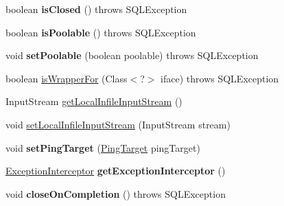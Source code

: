 \begin{DoxyCompactItemize}
boolean {\bfseries is\+Closed} ()  throws S\+Q\+L\+Exception 
\item 
\mbox{\label{classcom_1_1mysql_1_1cj_1_1jdbc_1_1_statement_impl_af6867cf70a7da2cf3141b4435116faeb}} 
boolean {\bfseries is\+Poolable} ()  throws S\+Q\+L\+Exception 
\item 
\mbox{\label{classcom_1_1mysql_1_1cj_1_1jdbc_1_1_statement_impl_ac5a27f06b5bc99195e039732366a33f5}} 
void {\bfseries set\+Poolable} (boolean poolable)  throws S\+Q\+L\+Exception 
\item 
boolean \mbox{\hyperlink{classcom_1_1mysql_1_1cj_1_1jdbc_1_1_statement_impl_a403bf25ba81ab01a60bdb9f2d4b4cfed}{is\+Wrapper\+For}} (Class$<$?$>$ iface)  throws S\+Q\+L\+Exception 
\item 
Input\+Stream \mbox{\hyperlink{classcom_1_1mysql_1_1cj_1_1jdbc_1_1_statement_impl_a52f35ba4029870388a69d493851e726a}{get\+Local\+Infile\+Input\+Stream}} ()
\item 
void \mbox{\hyperlink{classcom_1_1mysql_1_1cj_1_1jdbc_1_1_statement_impl_a398ed93fc7171fac680cd867a87cbf23}{set\+Local\+Infile\+Input\+Stream}} (Input\+Stream stream)
\item 
\mbox{\label{classcom_1_1mysql_1_1cj_1_1jdbc_1_1_statement_impl_abf41b78c8e7c3e4f62f7bedb8bf1a4b0}} 
void {\bfseries set\+Ping\+Target} (\mbox{\hyperlink{interfacecom_1_1mysql_1_1cj_1_1_ping_target}{Ping\+Target}} ping\+Target)
\item 
\mbox{\label{classcom_1_1mysql_1_1cj_1_1jdbc_1_1_statement_impl_a8c7aeabcfab5a1dcac5bf2fec0accaab}} 
\mbox{\hyperlink{interfacecom_1_1mysql_1_1cj_1_1exceptions_1_1_exception_interceptor}{Exception\+Interceptor}} {\bfseries get\+Exception\+Interceptor} ()
\item 
\mbox{\label{classcom_1_1mysql_1_1cj_1_1jdbc_1_1_statement_impl_acd9358a76e0fe9e8aa7f5cfb4ee6a5af}} 
void {\bfseries close\+On\+Completion} ()  throws S\+Q\+L\+Exception 
\item 
\mbox{\label{classcom_1_1mysql_1_1cj_1_1jdbc_1_1_statement_impl_a098584b310115f209ef1c28829438e28}} 

\end{DoxyCompactItemize}
